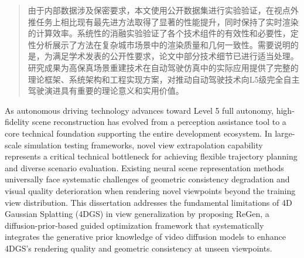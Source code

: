 \begin{abstract}
  由于内部数据涉及保密要求，本文使用公开数据集进行实验验证，在视点外推任务上相比现有最先进方法取得了显著的性能提升，同时保持了实时渲染的计算效率。系统性的消融实验验证了各个技术组件的有效性和必要性，定性分析展示了方法在复杂城市场景中的渲染质量和几何一致性。需要说明的是，为满足学术发表的公开性要求，论文中部分技术细节已进行适当处理。研究成果为高保真场景重建技术在自动驾驶仿真中的实际应用提供了完整的理论框架、系统架构和工程实现方案，对推动自动驾驶技术向L5级完全自主驾驶演进具有重要的理论意义和实用价值。

\end{abstract}

\begin{abstract*}
  As autonomous driving technology advances toward Level 5 full autonomy, high-fidelity scene reconstruction has evolved from a perception assistance tool to a core technical foundation supporting the entire development ecosystem. In large-scale simulation testing frameworks, novel view extrapolation capability represents a critical technical bottleneck for achieving flexible trajectory planning and diverse scenario evaluation. Existing neural scene representation methods universally face systematic challenges of geometric consistency degradation and visual quality deterioration when rendering novel viewpoints beyond the training view distribution. This dissertation addresses the fundamental limitations of 4D Gaussian Splatting (4DGS) in view generalization by proposing ReGen, a diffusion-prior-based guided optimization framework that systematically integrates the generative prior knowledge of video diffusion models to enhance 4DGS's rendering quality and geometric consistency at unseen viewpoints.


\end{abstract*}
